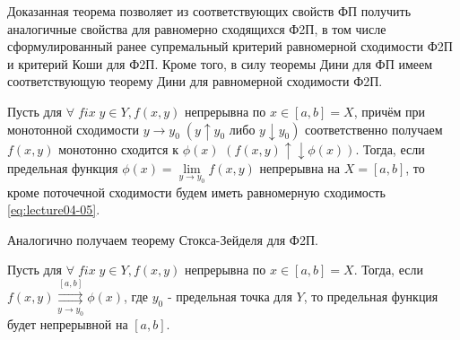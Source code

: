 \begin{notes}
	\item Доказанная теорема позволяет из соответствующих свойств ФП получить аналогичные свойства для равномерно сходящихся Ф2П, в том числе сформулированный ранее супремальный критерий равномерной сходимости Ф2П и критерий Коши для Ф2П. Кроме того, в силу теоремы Дини	для ФП имеем соответствующую теорему Дини для равномерной сходимости Ф2П.
	
	\begin{theorem}
		Пусть для $\forall \; fix \; y \in Y, f(x,y)$ непрерывна по $x \in [a,b] = X$, причём при монотонной сходимости \newline $y \to y_0 \; (y \uparrow y_0 \text{ либо } y \downarrow y_0)$ соответственно получаем	$f(x,y)$ монотонно сходится к $\phi(x)$ $\left(f(x,y) \uparrow \downarrow \phi(x)\right)$. Тогда, если предельная функция $\phi(x) = \lim\limits_{y \to y_0} f(x,y)$ непрерывна на $X = [a,b]$, то кроме поточечной сходимости будем иметь равномерную сходимость \eqref{eq:lecture04-05}.
	\end{theorem}
	\item 	Аналогично получаем теорему	Стокса-Зейделя для Ф2П.
	
	\begin{theorem}
		Пусть для $\forall \; fix \; y \in Y, f(x,y)$ непрерывна по $x \in [a,b] = X$.
		Тогда, если $ f(x,y) \overset{[a,b]}{\underset{y \to y_0}{\rightrightarrows}}  \phi(x)$, где $y_0$ - предельная точка для $Y$, то предельная функция будет непрерывной на $[a,b]$.
	\end{theorem}
\end{notes}